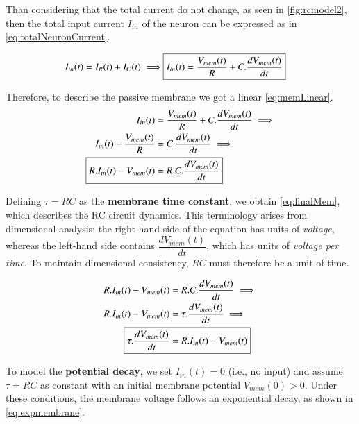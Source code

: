 			\par Than considering that the total current do not change, as seen in \autoref{fig:rcmodel2}, then the total input current $I_{in}$ of the neuron can be expressed as in \autoref{eq:totalNeuronCurrent}.
			
			\begin{equation}
				\label{eq:totalNeuronCurrent}
				\begin{aligned}
				I_{in}(t) = I_R(t) + I_C(t) \implies \Aboxed{I_{in}(t) = \frac{V_{mem}(t)}{R} + C.\dfrac{dV_{mem}(t)}{dt}}
				\end{aligned}
			\end{equation}
			\par Therefore, to describe the passive membrane we got a linear  \autoref{eq:memLinear}.
			\begin{equation}
				\label{eq:memLinear}
				\begin{aligned}
					I_{in}(t) &= \frac{V_{mem}(t)}{R} + C.\dfrac{dV_{mem}(t)}{dt} \implies \\ 
					I_{in}(t) - \frac{V_{mem}(t)}{R} &=  C.\dfrac{dV_{mem}(t)}{dt} \implies \\
					\Aboxed{R.I_{in}(t) - V_{mem}(t) &=  R.C.\dfrac{dV_{mem}(t)}{dt}}	
				\end{aligned}
			\end{equation}
	
			\par Defining $\tau = R C$ as the \textbf{membrane time constant}, we obtain \autoref{eq:finalMem}, which describes the RC circuit dynamics. This terminology arises from dimensional analysis: the right-hand side of the equation has units of \textit{voltage}, whereas the left-hand side contains $\dfrac{dV_{mem}(t)}{dt}$, which has units of \textit{voltage per time}. To maintain dimensional consistency, $R C$ must therefore be a unit of time.
	
			\begin{equation}
				\label{eq:finalMem}
				\begin{aligned}
				R.I_{in}(t) - V_{mem}(t) &=  R.C.\dfrac{dV_{mem}(t)}{dt} \implies \\
				R.I_{in}(t) - V_{mem}(t) &=  \tau.\dfrac{dV_{mem}(t)}{dt} \implies \\
				\Aboxed{\tau.\dfrac{dV_{mem}(t)}{dt} &= R.I_{in}(t) - V_{mem}(t)}
				\end{aligned}
			\end{equation}
			
			\par To model the \textbf{potential decay}, we set $I_{in}(t) = 0$ (i.e., no input) and assume $\tau = R C$ as constant with an initial membrane potential $V_{mem}(0) > 0$. Under these conditions, the membrane voltage follows an exponential decay, as shown in \autoref{eq:expmembrane}.
		
